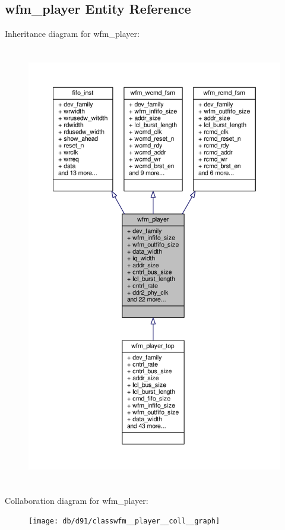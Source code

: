 \subsection{wfm\+\_\+player Entity Reference}
\label{classwfm__player}


Inheritance diagram for wfm\+\_\+player\+:\nopagebreak
\begin{figure}[H]
\begin{center}
\leavevmode
\includegraphics[height=550pt]{d3/dd7/classwfm__player__inherit__graph}
\end{center}
\end{figure}


Collaboration diagram for wfm\+\_\+player\+:\nopagebreak
\begin{figure}[H]
\begin{center}
\leavevmode
\texttt{[image: db/d91/classwfm\_\_player\_\_coll\_\_graph]}
\end{center}
\end{figure}
